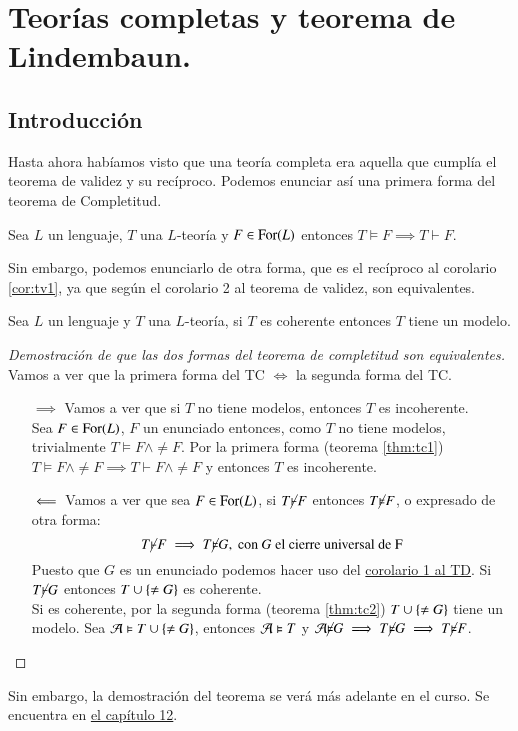 
\chapter{Teorías completas y teorema de Lindembaun.}

\section{Introducción}

Hasta ahora habíamos visto que una teoría completa era aquella que cumplía el teorema de validez y su recíproco. Podemos enunciar así una primera forma del teorema de Completitud.

\begin{thm}\label{thm:tc1}
    Sea $L$ un lenguaje, $T$ una $L$-teoría y $F \in \mathrm{For}(L)$ entonces $T \vDash F \implies T \vdash F$.
\end{thm}

Sin embargo, podemos enunciarlo de otra forma, que es el recíproco al corolario \ref{cor:tv1}, ya que según el corolario 2 al teorema de validez, son equivalentes.
\begin{thm}\label{thm:tc2}
    Sea $L$ un lenguaje y $T$ una $L$-teoría, si $T$ es coherente entonces $T$ tiene un modelo.
\end{thm}


\begin{proof}[Demostración de que las dos formas del teorema de completitud son equivalentes]
    Vamos a ver que la primera forma del TC $\iff$ la segunda forma del TC.
    \begin{itemize}
        \item[$\implies$] Vamos a ver que si $T$ no tiene modelos, entonces $T$ es incoherente.\\
        Sea $F \in \mathrm{For}(L)$, $F$ un enunciado entonces, como $T$ no tiene modelos, trivialmente $T \vDash F \land \neq F$. Por la primera forma (teorema \ref{thm:tc1}) $T \vDash F \land \neq F \implies T \vdash F \land \neq F$ y entonces $T$ es incoherente.

        \item[$\ \Longleftarrow\ $] Vamos a ver que sea $F \in \mathrm{For}(L)$, si $T \cancel\vdash F$ entonces $T \cancel\vDash F$, o expresado de otra forma:
        $$
            T \cancel\vdash F \implies T \cancel\vDash G, \text{ con $G$ el cierre universal de F}
        $$
        Puesto que $G$ es un enunciado podemos hacer uso del \hyperref[cor:td1]{corolario 1 al TD}. Si $T \cancel\vdash G$ entonces $T \cup \left\{\neq G\right\}$ es coherente.\\
        Si es coherente, por la segunda forma (teorema \ref{thm:tc2}) $T \cup \left\{\neq G\right\}$ tiene un modelo. Sea $\mathcal{A} \vDash T \cup \left\{\neq G\right\}$, entonces $\mathcal{A} \vDash T$ y $\mathcal{A} \cancel\vDash G \implies T \cancel\vDash G \implies T \cancel\vDash F$.
    \end{itemize}
\end{proof}
Sin embargo, la demostración del teorema se verá más adelante en el curso. Se encuentra en \hyperref[proof:tc2]{el capítulo 12}.

